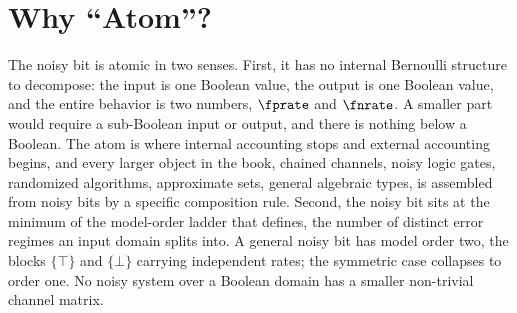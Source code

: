 %
%
%
%

\section{Why ``Atom''?}
\label{sec:why-atom}

The noisy bit is atomic in two senses. First, it has no internal Bernoulli
structure to decompose: the input is one Boolean value, the output is one
Boolean value, and the entire behavior is two numbers, $\fprate$ and $\fnrate$.
A smaller part would require a sub-Boolean input or output, and there is
nothing below a Boolean. The atom is where internal accounting stops and
external accounting begins, and every larger object in the book, chained
channels, noisy logic gates, randomized algorithms, approximate sets, general
algebraic types, is assembled from noisy bits by a specific composition rule.
Second, the noisy bit sits at the minimum of the model-order ladder that
 defines, the number of distinct error regimes an input
domain splits into. A general noisy bit has model order two, the blocks
$\{\top\}$ and $\{\bot\}$ carrying independent rates; the symmetric case
collapses to order one. No noisy system over a Boolean domain has a smaller
non-trivial channel matrix.

